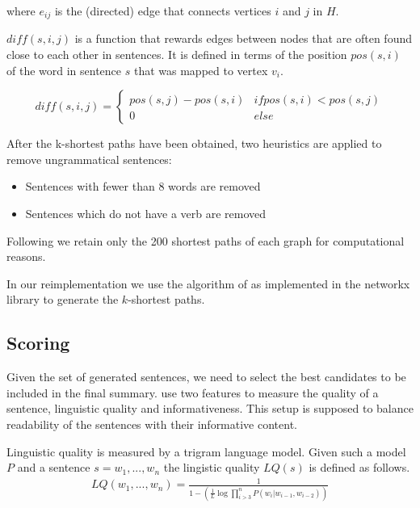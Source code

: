 \documentclass[a4paper,BCOR=10mm]{report}
\numberwithin{lemma}{chapter}
\numberwithin{definition}{chapter}
\begin{document}
where $e_{ij}$ is the (directed) edge that connects vertices $i$ and $j$ in $H$.

$\mathit{diff}(s, i, j)$ is a function that rewards edges between nodes that are often found close to each other in sentences. It is defined in terms of the position $\mathit{pos}(s, i)$ of the word in sentence $s$ that was mapped to vertex $v_i$.

\begin{equation}
\mathit{diff}(s, i, j) = \begin{cases}
\mathit{pos}(s, j) - \mathit{pos}(s, i) & \mathit{if }\mathit{pos}(s, i) < \mathit{pos}(s, j) \\
0 & \mathit{else}
\end{cases}
\end{equation}

After the k-shortest paths have been obtained, two heuristics are applied to remove ungrammatical sentences:

\begin{itemize}
    \item {Sentences with fewer than $8$ words are removed}
    \item {Sentences which do not have a verb are removed}
\end{itemize}

Following \citet{banerjee} we retain only the 200 shortest paths of each graph for computational reasons.

In our reimplementation we use the algorithm of \citet{kshortestpath} as implemented in the networkx library \citep{networkx} to generate the $k$-shortest paths.

\subsection{Scoring} \label{sec:baseline-scoring}

Given the set of generated sentences, we need to select the best candidates to be included in the final summary. \citet{banerjee} use two features to measure the quality of a sentence, linguistic quality and informativeness. This setup is supposed to balance readability of the sentences with their informative content.

Linguistic quality is measured by a trigram language model. Given such a model $P$ and a sentence $s = w_1, ..., w_n$ the lingistic quality $LQ(s)$ is defined as follows.
\begin{align}
LQ(w_1, ..., w_n) = \frac{1}{1 - (\frac{1}{L} \log \prod_{i > 3}^{n} P(w_i | w_{i - 1}, w_{i - 2}))}
\end{align}
\end{document}
